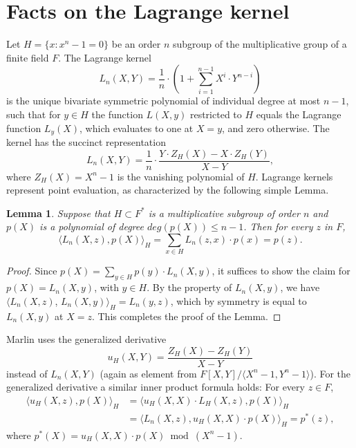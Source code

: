 \documentclass[10pt,article,oneside]{memoir}
\newtheorem{lem}[]{Lemma}
\theoremstyle{definition}
\theoremstyle{remark}
\begin{document}
\section{Facts on the Lagrange kernel}
\label{s:LagrangeKernel}
Let $H=\{x: x^n-1=0\}$ be an order $n$ subgroup of the multiplicative group of a finite field $F$.
The Lagrange kernel 
\[
L_n(X,Y) =\frac{1}{n}\cdot \left( 1+ \sum_{i=1}^{n-1} X^i\cdot Y^{n-i}\right) 
\]
is the unique bivariate symmetric polynomial of individual degree at most $n-1$, such that for $y\in H$ the function $L(X,y)$ restricted to $H$ equals the Lagrange function $L_y(X)$, which evaluates to one at $X=y$, and zero otherwise.
The  kernel has the succinct representation
\[
L_n(X, Y)=\frac{1}{n}\cdot \frac{Y\cdot Z_H(X) - X\cdot Z_H(Y)}{ X- Y},
\]
where $Z_H(X)=X^n-1$ is the vanishing polynomial of $H$.
Lagrange kernels represent point evaluation, as characterized by the following simple Lemma.

\begin{lem}
\label{lem:LagrangeKernel}
Suppose that $H\subset F^*$ is a multiplicative subgroup of order $n$ and $p(X)$ is a polynomial of degree $deg(p(X))\leq n-1$. Then for every $z$ in $F$,
\[
\big\langle L_n(X, z), p(X)\big\rangle_H = \sum_{x\in H} L_n(z, x) \cdot p(x) = p(z).
\] 
\end{lem}
\begin{proof}
Since $p(X) = \sum_{y\in H} p(y)\cdot L_n(X,y)$, it suffices to show the claim for $p(X)=L_n(X,y)$, with $y\in H$.
By the property of $L_n(X,y)$, we have $\big\langle L_n(X, z)$, $L_n(X,y) \big\rangle_H =L_n(y,z)$, which by symmetry is equal to $L_n(X,y)$ at $X=z$.
This completes the proof of the Lemma.
\end{proof}

Marlin \cite{Marlin} uses the generalized derivative 
\[
u_H(X,Y)= \frac{Z_H(X)-Z_H(Y)}{X-Y}
\]
instead of $L_n(X,Y)$ (again as element from $F[X,Y]/\langle X^n-1,Y^n-1\rangle$).
For the generalized derivative a similar inner product formula holds:
For every $z\in F$,
\begin{align*}
\big\langle u_H(X, z), p(X)\big\rangle_H &=  \big\langle u_H(X,X)\cdot L_H(X, z), p(X)\big\rangle_H
\\
&= \big\langle L_n(X, z), u_H(X,X)\cdot p(X)\big\rangle_H = p^*(z),
\end{align*}
where $p^*(X) = u_H(X,X)\cdot p(X) \bmod (X^n-1)$.
\end{document}
